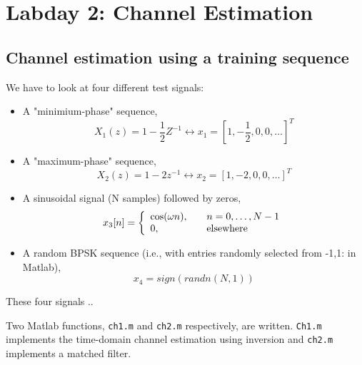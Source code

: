 \documentclass[final]{scrreprt} %
\begin{document}
\chapter{Labday 2: Channel Estimation}
\label{ch:labday2}

\section{Channel estimation using a training sequence}

We have to look at four different test signals:

\begin{itemize}
\item 	A "minimium-phase" sequence, 
\begin{equation}
X_1(z) = 1 - \dfrac{1}{2}Z^{-1} \leftrightarrow x_1 = [1, -\dfrac{1}{2}, 0, 0,  \dots]^T
\end{equation}
\item A "maximum-phase" sequence,
\begin{equation}
X_2(z) = 1 - 2z^{-1} \leftrightarrow x_2 = [1, -2, 0, 0, \dots]^T
\end{equation}
\item A sinusoidal signal (N samples) followed by zeros,
\[ x_3[n] = \left\{ 
  \begin{array}{l l}
    \cos(\omega n), & \quad n = 0, \dots ,N - 1\\
    0, & \quad \textrm{elsewhere}
  \end{array} \right.\]
\item A random BPSK sequence (i.e., with entries randomly selected from {-1,1}: in Matlab),
\begin{equation}
x_4 = sign(randn(N,1))
\end{equation}
\end{itemize}

These four signals ..

Two Matlab functions, \texttt{ch1.m} and \texttt{ch2.m} respectively, are written. 
\texttt{Ch1.m} implements the time-domain channel estimation using inversion and \texttt{ch2.m} implements a matched filter.
\end{document}
